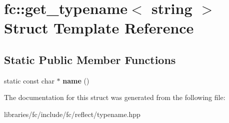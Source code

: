 \hypertarget{structfc_1_1get__typename_3_01string_01_4}{}\section{fc\+:\+:get\+\_\+typename$<$ string $>$ Struct Template Reference}
\label{structfc_1_1get__typename_3_01string_01_4}
\subsection*{Static Public Member Functions}
\begin{DoxyCompactItemize}
\item 
\mbox{\label{structfc_1_1get__typename_3_01string_01_4_ab0464ea6c895df12f0b5deec6a641ad1}} 
static const char $\ast$ {\bfseries name} ()
\end{DoxyCompactItemize}


The documentation for this struct was generated from the following file\+:\begin{DoxyCompactItemize}
\item 
libraries/fc/include/fc/reflect/typename.\+hpp\end{DoxyCompactItemize}
